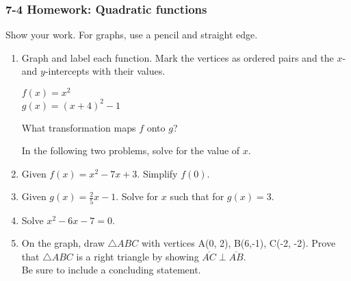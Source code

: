\documentclass[12pt, twoside]{article}
\begin{document}
\subsubsection*{7-4 Homework: Quadratic functions}
Show your work. For graphs, use a pencil and straight edge.
  \begin{enumerate}

\item Graph and label each function. Mark the vertices as ordered pairs and the $x$- and $y$-intercepts with their values.
        \vspace{0.25cm}
        \begin{multicols}{2}
          $f(x)=x^2$\\
          $g(x)=(x+4)^2-1$
        \end{multicols}
        What transformation maps $f$ onto $g$?
        \vspace{2.25cm}

    \begin{center} %
    \end{center}


    In the following two problems, solve for the value of $x$.

\newpage

\item Given $f(x)=x^2-7x+3$. Simplify $f(0)$. \vspace{2cm}
\item Given $g(x)=\frac{2}{5} x-1$. Solve for $x$ such that for $g(x)=3$. \vspace{2.5cm}
\item Solve $x^2-6x-7=0$. \vspace{3cm}


\item On the graph, draw $\triangle ABC$ with vertices A(0, 2), B(6,-1), C(-2, -2). Prove that $\triangle ABC$ is a right triangle by showing $\overline{AC} \perp \overline{AB}$. \\[0.5cm]
Be sure to include a concluding statement.\\[1cm]

\end{enumerate}
\end{document}
